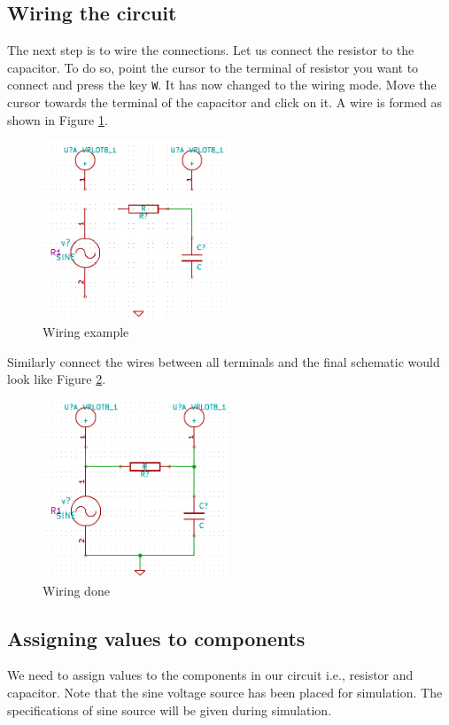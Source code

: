 \subsection{Wiring the circuit}
The next step is to wire the connections. Let us connect the resistor to the capacitor. To do so, point the cursor to the terminal of resistor you want to connect and press the key {\tt W}. It has now changed to the wiring mode. Move the cursor towards the terminal of the capacitor and click on it. A wire is formed as shown in Figure \ref{wire1}.
\begin{figure}
\centering
\includegraphics[width=0.5\textwidth]{figures/wire1}
\caption{Wiring example}
\label{wire1}
\end{figure}
Similarly connect the wires between all terminals and the final schematic would look like Figure \ref{wirefin}.
\begin{figure}
\centering
\includegraphics[width=0.5\textwidth]{figures/wirefin}
\caption{Wiring done}
\label{wirefin}
\end{figure}
\subsection{Assigning values to components}
We need to assign values to the components in our circuit i.e., resistor and capacitor. Note that the sine voltage source has been placed for simulation. The specifications of sine source will be given during simulation.

